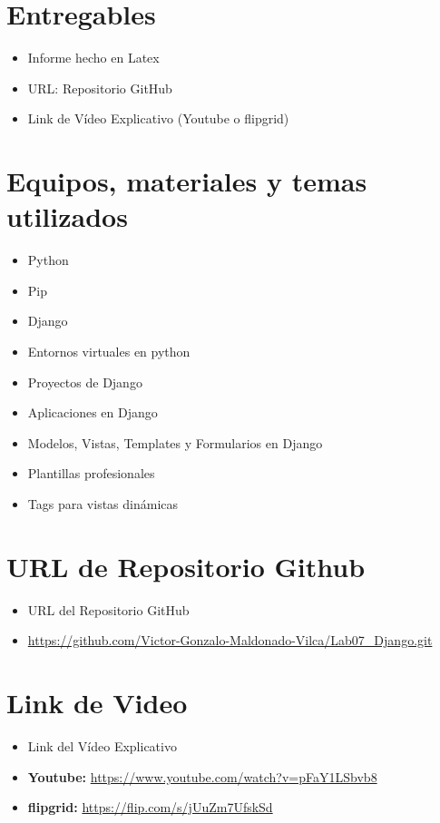 \documentclass{article}
\begin{document}
 
 
  \section{Entregables}
  \begin{itemize}
    \item Informe hecho en Latex
    \item URL: Repositorio GitHub
    \item Link de Vídeo Explicativo (Youtube o flipgrid)
  \end{itemize}
  
		
	\section{Equipos, materiales y temas utilizados}
  \begin{itemize}
    \item Python
    \item Pip
    \item Django
    \item Entornos virtuales en python
    \item Proyectos de Django
    \item Aplicaciones en Django
    \item Modelos, Vistas, Templates y Formularios en Django
    \item Plantillas profesionales 
    \item Tags para vistas dinámicas

  \end{itemize}
 

  \section{URL de Repositorio Github}
  \begin{itemize}
    \item URL del Repositorio GitHub
    \item \url{https://github.com/Victor-Gonzalo-Maldonado-Vilca/Lab07_Django.git}
  \end{itemize}
  

	\section{Link de Video}
  \begin{itemize}
    \item Link del Vídeo Explicativo
    \item \textbf{Youtube: } \url{https://www.youtube.com/watch?v=pFaY1LSbvb8}
    \item \textbf{flipgrid: } \url{https://flip.com/s/jUuZm7UfskSd}
  \end{itemize}
\end{document}
